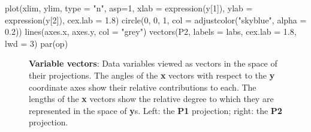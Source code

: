 \documentclass[
  letterpaper,
  10pt,
  krantz2]{krantz}
\makeatletter
\newenvironment{Shaded}{\begin{snugshade}}{\end{snugshade}}
\newcommand{\AttributeTok}[1]{\textcolor[rgb]{0.40,0.45,0.13}{#1}}
\newcommand{\DecValTok}[1]{\textcolor[rgb]{0.68,0.00,0.00}{#1}}
\newcommand{\FloatTok}[1]{\textcolor[rgb]{0.68,0.00,0.00}{#1}}
\newcommand{\FunctionTok}[1]{\textcolor[rgb]{0.28,0.35,0.67}{#1}}
\newcommand{\NormalTok}[1]{\textcolor[rgb]{0.00,0.23,0.31}{#1}}
\newcommand{\StringTok}[1]{\textcolor[rgb]{0.13,0.47,0.30}{#1}}
\newenvironment{kframe}{%
  \medskip{}
  \setlength{\fboxsep}{.8em}
  \def\at@end@of@kframe{}%
  \ifinner\ifhmode%
  \def\at@end@of@kframe{\end{minipage}}%
  \begin{minipage}{\columnwidth}%
  \fi\fi%
  \def\FrameCommand##1{\hskip\@totalleftmargin \hskip-\fboxsep
  \colorbox{shadecolor}{##1}\hskip-\fboxsep
      \hskip-\linewidth \hskip-\@totalleftmargin \hskip\columnwidth}%
  \MakeFramed {\advance\hsize-\width
    \@totalleftmargin\z@ \linewidth\hsize
    \@setminipage}}%
{\par\unskip\endMakeFramed%
  \at@end@of@kframe}
\renewenvironment{Shaded}{\begin{kframe}}{\end{kframe}}
\makeatother
\begin{document}
\begin{Shaded}
\begin{Highlighting}[]
\FunctionTok{plot}\NormalTok{(xlim, ylim, }\AttributeTok{type =} \StringTok{"n"}\NormalTok{, }\AttributeTok{asp=}\DecValTok{1}\NormalTok{,}
     \AttributeTok{xlab =} \FunctionTok{expression}\NormalTok{(y[}\DecValTok{1}\NormalTok{]), }\AttributeTok{ylab =} \FunctionTok{expression}\NormalTok{(y[}\DecValTok{2}\NormalTok{]),}
     \AttributeTok{cex.lab =} \FloatTok{1.8}\NormalTok{)}
\FunctionTok{circle}\NormalTok{(}\DecValTok{0}\NormalTok{, }\DecValTok{0}\NormalTok{, }\DecValTok{1}\NormalTok{, }\AttributeTok{col =} \FunctionTok{adjustcolor}\NormalTok{(}\StringTok{"skyblue"}\NormalTok{, }\AttributeTok{alpha =} \FloatTok{0.2}\NormalTok{))}
\FunctionTok{lines}\NormalTok{(axes.x, axes.y, }\AttributeTok{col =} \StringTok{"grey"}\NormalTok{)}
\FunctionTok{vectors}\NormalTok{(P2, }\AttributeTok{labels =}\NormalTok{ labs, }\AttributeTok{cex.lab =} \FloatTok{1.8}\NormalTok{, }\AttributeTok{lwd =} \DecValTok{3}\NormalTok{)}
\FunctionTok{par}\NormalTok{(op)}
\end{Highlighting}
\end{Shaded}

\begin{figure}%
\end{figure}%

\begin{figure}


\caption{\label{fig-proj-vectors}\textbf{Variable vectors}: Data
variables viewed as vectors in the space of their projections. The
angles of the \textbf{x} vectors with respect to the \textbf{y}
coordinate axes show their relative contributions to each. The lengths
of the \textbf{x} vectors show the relative degree to which they are
represented in the space of \textbf{y}s. Left: the \textbf{P1}
projection; right: the \textbf{P2} projection.}

\end{figure}%
\end{document}

